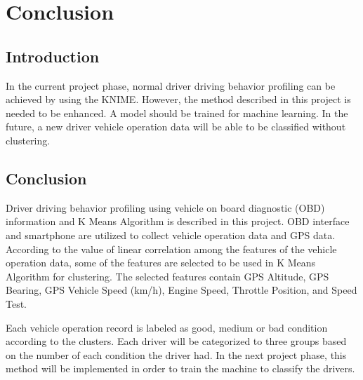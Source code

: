 \chapter{Conclusion}
\section{Introduction}
In the current project phase, normal driver driving behavior profiling can be achieved by using the KNIME. However, the method described in this project is needed to be enhanced. A model should be trained for machine learning. In the future, a new driver vehicle operation data will be able to be classified without clustering. 

\section{Conclusion}

Driver driving behavior profiling using vehicle on board diagnostic (OBD) information and K Means Algorithm is described in this project. OBD interface and smartphone are utilized to collect vehicle operation data and GPS data. According to the value of linear correlation among the features of the vehicle operation data, some of the features are selected to be used in K Means Algorithm for clustering. The selected features contain GPS Altitude, GPS Bearing, GPS Vehicle Speed (km/h), Engine Speed, Throttle Position, and Speed Test. 

Each vehicle operation record is labeled as good, medium or bad condition according to the clusters. Each driver will be categorized to three groups based on the number of each condition the driver had. In the next project phase, this method will be implemented in order to train the machine to classify the drivers.
